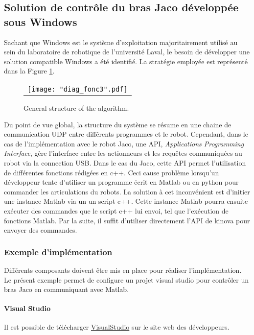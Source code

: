 \subsection{Solution de contrôle du bras Jaco développée sous Windows}

Sachant que Windows est le système d'exploitation majoritairement utilisé au sein du laboratoire de robotique de l'université Laval, le besoin de développer une solution compatible Windows a été identifié. 
La stratégie employée est représenté dans la Figure \ref{fig:diag}.
\begin{figure}
 \begin{center}
  \begin{tabular}{c}
    \texttt{[image: "diag\_fonc3".pdf]}
  \end{tabular}
 \end{center}
\caption{General structure of the algorithm.}
 \label{fig:diag}
\end{figure}
Du point de vue global, la structure du système se résume en une chaine de communication UDP entre différents programmes et le robot. 
Cependant, dans le cas de l'implémentation avec le robot Jaco, une API, \textit{Applications Programming Interface}, gère l'interface entre les actionneurs et les requêtes communiquées au robot via la connection USB.
Dans le cas du Jaco, cette API permet l'utilisation de différentes fonctions rédigées en c++.
Ceci cause problème lorsqu'un développeur tente d'utiliser un programme écrit en Matlab ou en python pour commander les articulations du robots.
La solution à cet inconvénient est d'initier une instance Matlab via un un script c++.
Cette instance Matlab pourra ensuite exécuter des commandes que le script c++ lui envoi, tel que l’exécution de fonctions Matlab.
Par la suite, il suffit d'utiliser directement l'API de kinova pour envoyer des commandes.

\subsubsection{Exemple d'implémentation}

Différents composants doivent être mis en place pour réaliser l'implémentation.
Le présent exemple permet de configure un projet visual studio pour contrôler un bras Jaco en communiquant avec Matlab.
\paragraph{Visual Studio}
Il est possible de télécharger \href{https://www.visualstudio.com/thank-you-downloading-visual-studio/?sku=Community&rel=15}{VisualStudio} sur le site web des développeurs.

